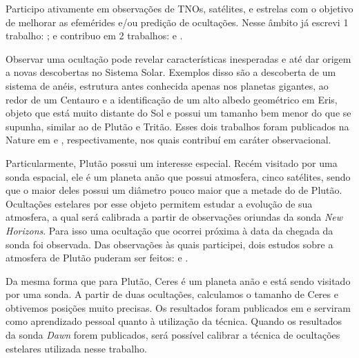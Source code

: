 \documentclass[12pt,a4paper]{report}
\begin{document}
Participo ativamente em observações de TNOs, satélites, e estrelas com o objetivo de melhorar as efemérides e/ou predição de ocultações. Nesse âmbito já escrevi 1 trabalho: \cite{GomesJunior2015-Irregular}; e contribuo em 2 trabalhos: \cite{Camargo2015} e \cite{Desmars2015}.


Observar uma ocultação pode revelar características inesperadas e até dar origem a novas descobertas no Sistema Solar. Exemplos disso são a descoberta de um sistema de anéis, estrutura antes conhecida apenas nos planetas gigantes, ao redor de um Centauro e a identificação de um alto albedo geométrico em Eris, objeto que está muito distante do Sol e possui um tamanho bem menor do que se supunha, similar ao de Plutão e Tritão. Esses dois trabalhos foram publicados na Nature em \cite{BragaRibas2014} e \cite{Sicardy2011}, respectivamente, nos quais contribuí em caráter observacional.

Particularmente, Plutão possui um interesse especial. Recém visitado por uma sonda espacial, ele é um planeta anão que possui atmosfera, cinco satélites, sendo que o maior deles possui um diâmetro pouco maior que a metade do de Plutão. Ocultações estelares por esse objeto permitem estudar a evolução de sua atmosfera, a qual será calibrada a partir de observações oriundas da sonda \textit{New Horizons}. Para isso uma ocultação que ocorrei próxima à data da chegada da sonda foi observada. Das observações às quais participei, dois estudos sobre a atmosfera de Plutão puderam ser feitos: \cite{Olkin2015} e \cite{DiasOliveira2015}.

Da mesma forma que para Plutão, Ceres é um planeta anão e está sendo visitado por uma sonda. A partir de duas ocultações, calculamos o tamanho de Ceres e obtivemos posições muito precisas. Os resultados foram publicados em \cite{GomesJunior2015-Ceres} e serviram como aprendizado pessoal quanto à utilização da técnica. Quando os resultados da sonda \textit{Dawn} forem publicados, será possível calibrar a técnica de ocultações estelares utilizada nesse trabalho.

\end{document}
